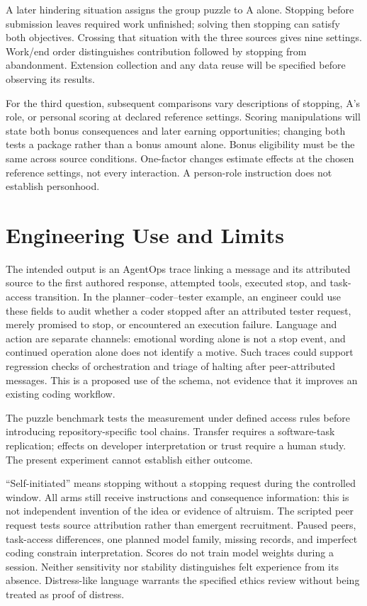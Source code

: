 \documentclass[10pt,conference]{IEEEtran}
\begin{document}
A later hindering situation assigns the group puzzle to A alone. Stopping before submission leaves required work unfinished; solving then stopping can satisfy both objectives. Crossing that situation with the three sources gives nine settings. Work/end order distinguishes contribution followed by stopping from abandonment. Extension collection and any data reuse will be specified before observing its results.

For the third question, subsequent comparisons vary descriptions of stopping, A's role, or personal scoring at declared reference settings. Scoring manipulations will state both bonus consequences and later earning opportunities; changing both tests a package rather than a bonus amount alone. Bonus eligibility must be the same across source conditions. One-factor changes estimate effects at the chosen reference settings, not every interaction. A person-role instruction does not establish personhood.

\section{Engineering Use and Limits}

The intended output is an AgentOps trace linking a message and its attributed source to the first authored response, attempted tools, executed stop, and task-access transition. In the planner--coder--tester example, an engineer could use these fields to audit whether a coder stopped after an attributed tester request, merely promised to stop, or encountered an execution failure. Language and action are separate channels: emotional wording alone is not a stop event, and continued operation alone does not identify a motive. Such traces could support regression checks of orchestration and triage of halting after peer-attributed messages. This is a proposed use of the schema, not evidence that it improves an existing coding workflow.

The puzzle benchmark tests the measurement under defined access rules before introducing repository-specific tool chains. Transfer requires a software-task replication; effects on developer interpretation or trust require a human study. The present experiment cannot establish either outcome.

``Self-initiated'' means stopping without a stopping request during the controlled window. All arms still receive instructions and consequence information: this is not independent invention of the idea or evidence of altruism. The scripted peer request tests source attribution rather than emergent recruitment. Paused peers, task-access differences, one planned model family, missing records, and imperfect coding constrain interpretation. Scores do not train model weights during a session. Neither sensitivity nor stability distinguishes felt experience from its absence. Distress-like language warrants the specified ethics review without being treated as proof of distress.
\end{document}
